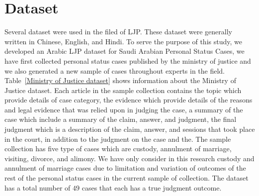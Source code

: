 \documentclass[sn-mathphys,Numbered]{sn-jnl}%
\theoremstyle{thmstyleone}%
\theoremstyle{thmstyletwo}%
\theoremstyle{thmstylethree}%
\begin{document}
\begin{comment}
Li et al. presented a cognitive computing framework to address the challenges of semantic understanding, knowledge learning, and judicial reasoning in the Chinese legal domain. The legal semantics understanding layer, the legal knowledge learning layer, and the legal knowledge reasoning layer are the three layers of the cognitive computing framework. They evaluated their framework in the context of Chinese divorce cases. Standard methods such as Chinese word segmentation, lexical labeling, named entity extraction, text classification, keyword extraction, name replacement, and so on are used to preprocess judicial documents and fact descriptions. The data was collected from China Judgments Online. There are 695,418 judicial documents of divorce cases. They picked 50,000 judicial documents randomly. Precision, recall, and F1 was used to evaluate the prediction task. The \gls{CCF} method can effectively predict divorce decisions with various expression styles and outperforms existing methods such as \gls{SVM}. Their machine-learning prediction results are simple to understand for the general public because induction rules are provided\citep*{li2019research}.\\




\end{comment}


\section{Dataset}

Several dataset were used in the filed of LJP. These dataset were generally written in Chinese, English, and Hindi. To serve the purpose of this study, we developed an Arabic LJP dataset for Saudi Arabian Personal Status Cases, we have first collected personal status cases published by the ministry of justice and we also generated a new sample of cases throughout experts in the field. Table~\ref{Ministry of Justice dataset} shows information about the Ministry of Justice dataset. Each article in the sample collection  contains the topic which provide details of case category, the evidence which provide details of the reasons and legal evidence that was relied upon in judging the case, a  summary of the case which include a summary of the claim, answer, and judgment, the final judgment which is a description of the claim, answer, and sessions that took place in the court, in addition to the judgment on the case and the. The sample collection has five type of cases which are custody, annulment of marriage, visiting, divorce, and alimony. We have only consider in this research custody and annulment of marriage cases due to limitation and variation of outcomes of the rest of the personal status cases in the current sample of collection. The dataset has a total number of $49$ cases that each has a true judgment outcome. 
\end{document}
